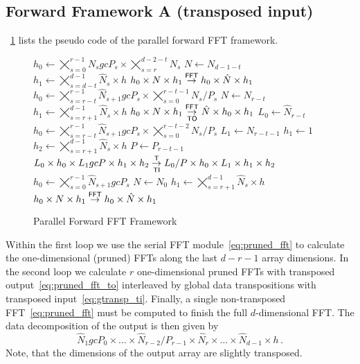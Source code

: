 \subsection{Forward Framework A (transposed input)}
\figurename{}~\ref{fig:fft_forw} lists the pseudo code of the parallel forward FFT framework.
\begin{figure}[ht]
  \begin{algorithmic}[1]
      \State $h_0 \gets \bigtimes_{s=0}^{r-1} N_sgcP_s \times \bigtimes_{s=r}^{d-2-t} N_s$
      \State $N   \gets N_{d-1-t}$
      \State $h_1 \gets \bigtimes_{s=d-t}^{d-1} \hat N_s \times h$
      \State $h_0 \times N \times h_1 \overset{\textsf{FFT}}{\rightarrow} h_0 \times \hat N \times h_1$
    \EndFor
      \State $h_0 \gets \bigtimes_{s=r-t}^{r-1} \hat N_{s+1}gcP_s \times \bigtimes_{s=0}^{r-t-1} N_s/P_s$
      \State $N   \gets N_{r-t}$
      \State $h_1 \gets \bigtimes_{s=r+1}^{d-1} \hat N_s \times h$
      \State $h_0 \times N \times h_1 \overset{\textsf{FFT}}{\underset{\textsf{TO}}{\rightarrow}} \hat N \times h_0 \times h_1$
      \State
      \State $L_0 \gets \hat N_{r-t}$
      \State $h_0 \gets \bigtimes_{s=r-t}^{r-1}\hat N_{s+1}gcP_{s} \times \bigtimes_{s=0}^{r-t-2} N_s/P_s$
      \State $L_1 \gets N_{r-t-1}$
      \State $h_1 \gets 1$
      \State $h_2 \gets \bigtimes_{s=r+1}^{d-1} \hat N_s \times h$
      \State $P   \gets P_{r-t-1}$
      \State $L_0 \times h_0 \times L_1gcP \times h_1 \times h_2\overset{\textsf{T}}{\underset{\textsf{TI}}{\rightarrow}} L_0/P \times h_0 \times L_1 \times h_1 \times h_2$
    \EndFor
    \State $h_0 \gets \bigtimes_{s=0}^{r-1}\hat N_{s+1}gcP_s$
    \State $N   \gets N_0$
    \State $h_1 \gets \bigtimes_{s=r+1}^{d-1} \hat N_s \times h$
    \State $h_0 \times N \times h_1 \overset{\textsf{FFT}}{\rightarrow} h_0 \times \hat N \times h_1$
  \end{algorithmic}
  \caption{Parallel Forward FFT Framework}\label{fig:fft_forw}
\end{figure}

Within the first loop we use the serial FFT module~\eqref{eq:pruned_fft} to calculate
the one-dimensional (pruned) FFTs along the last $d-r-1$ array dimensions.
In the second loop we calculate $r$ one-dimensional pruned FFTs with transposed output~\eqref{eq:pruned_fft_to}
interleaved by global data transpositions with transposed input~\eqref{eq:gtransp_ti}.
Finally, a single non-transposed FFT~\eqref{eq:pruned_fft} must be computed to finish the full $d$-dimensional FFT.
The data decomposition of the output is then given by
\begin{equation*}
  \hat N_1gcP_0 \times \hdots \times \hat N_{r-2}/P_{r-1} \times \hat N_r \times \hdots \times \hat N_{d-1} \times h\,.
\end{equation*}
Note, that the dimensions of the output array are slightly transposed.

